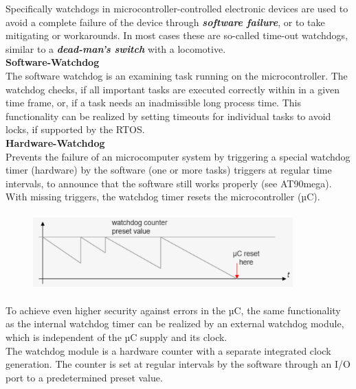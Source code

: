 Specifically watchdogs in microcontroller-controlled electronic devices are used to avoid a complete failure of the device through \textbf{\textit{software failure}}, or to take mitigating or workarounds. In most cases these are so-called time-out watchdogs, similar to a \textbf{\textit{dead-man's switch}} with a locomotive.\\

{\rot\bf Software-Watchdog}\\

The software watchdog is an examining task running on the microcontroller. The watchdog checks, if all important tasks are executed correctly within in a given time frame, or, if a task needs an inadmissible long process time. This functionality can be realized by setting timeouts for individual tasks to avoid locks, if supported by the RTOS.\\

{\rot\bf Hardware-Watchdog}\\

Prevents the failure of an microcomputer system by triggering a special watchdog timer (hardware) by the software (one or more tasks) triggers at regular time intervals, to announce that the software still works properly (see AT90mega). With missing triggers, the watchdog timer resets the microcontroller (µC).

    \begin{figure}[h]
    \centering
    \includegraphics[width=10cm, height=3cm]{Images/image164.png}
    \label{fig:Fig }
    \end{figure}

To achieve even higher security against errors in the µC, the same functionality as the internal watchdog timer can be realized by an external watchdog module, which is independent of the µC supply and its clock. \\

The watchdog module is a hardware counter with a separate integrated clock generation. The counter is set at regular intervals by the software through an I/O port to a predetermined preset value.\\

